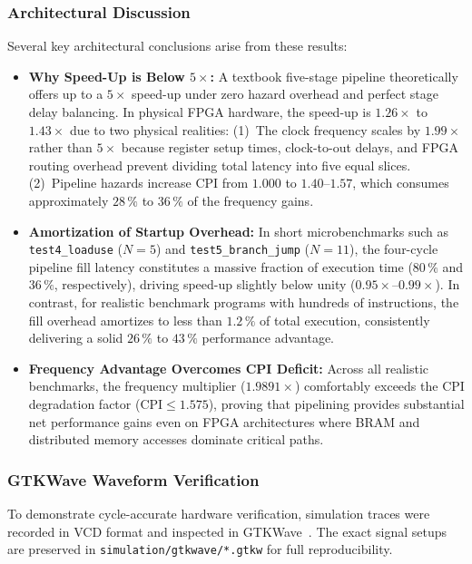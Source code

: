 \subsubsection{Architectural Discussion}
Several key architectural conclusions arise from these results:
\begin{itemize}
  \item \textbf{Why Speed-Up is Below $5\times$:} A textbook five-stage pipeline
        theoretically offers up to a $5\times$ speed-up under zero hazard overhead and
        perfect stage delay balancing. In physical FPGA hardware, the speed-up is
        $1.26\times$ to $1.43\times$ due to two physical realities:
        (1)~The clock frequency scales by $1.99\times$ rather than $5\times$ because
        register setup times, clock-to-out delays, and FPGA routing overhead prevent
        dividing total latency into five equal slices.
        (2)~Pipeline hazards increase CPI from $1.000$ to $1.40$--$1.57$, which consumes
        approximately $28\,\%$ to $36\,\%$ of the frequency gains.
  \item \textbf{Amortization of Startup Overhead:} In short microbenchmarks such as
        \texttt{test4\_loaduse} ($N=5$) and \texttt{test5\_branch\_jump} ($N=11$), the
        four-cycle pipeline fill latency constitutes a massive fraction of execution time
        ($80\,\%$ and $36\,\%$, respectively), driving speed-up slightly below unity
        ($0.95\times$--$0.99\times$). In contrast, for realistic benchmark programs with
        hundreds of instructions, the fill overhead amortizes to less than $1.2\,\%$ of
        total execution, consistently delivering a solid $26\,\%$ to $43\,\%$ performance
        advantage.
  \item \textbf{Frequency Advantage Overcomes CPI Deficit:} Across all realistic benchmarks,
        the frequency multiplier ($1.9891\times$) comfortably exceeds the CPI degradation
        factor ($\text{CPI} \le 1.575$), proving that pipelining provides substantial
        net performance gains even on FPGA architectures where BRAM and distributed memory
        accesses dominate critical paths.
\end{itemize}

\subsubsection{GTKWave Waveform Verification}
To demonstrate cycle-accurate hardware verification, simulation traces were recorded in
VCD format and inspected in GTKWave~\cite{vikashBybellGTKWave}. The exact signal setups
are preserved in \texttt{simulation/gtkwave/*.gtkw} for full reproducibility.

